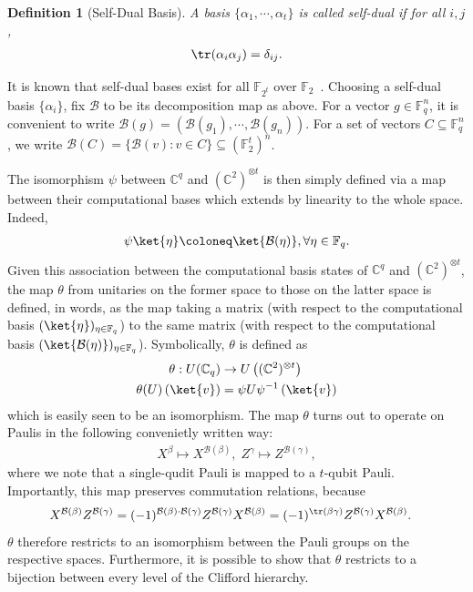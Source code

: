 \documentclass[11pt]{article}
\newtheorem{definition}[theorem]{Definition}
\theoremstyle{definition}
\newcommand{\al}{\alpha}
\newcommand{\CC}{\mathbb{C}}
\newcommand{\FF}{\mathbb{F}}
\newcommand{\B}{\mathcal{B}}
\begin{document}
\begin{definition}[Self-Dual Basis]
    A basis $\{\al_1, \cdots, \al_t\}$ is called self-dual if for all $i,j$,
    \begin{align}
        \tr(\al_i\al_j) = \delta_{ij}.
    \end{align}
\end{definition}
It is known that self-dual bases exist for all $\FF_{2^t}$ over $\mathbb{F}_2$~\cite{seroussi1980factorization}. Choosing a self-dual basis $\{\al_i\}$, fix $\B$ to be its decomposition map as above. 
For a vector $g\in \FF_q^n$, it is convenient to write $\B(g) = (\B(g_1), \cdots, \B(g_n))$. 
For a set of vectors $C\subseteq \FF_q^n$, we write $\B(C) = \{\B(v):v\in C\}\subseteq (\FF_2^t)^n$.

The isomorphism $\psi$ between $\mathbb{C}^q$ and $(\mathbb{C}^2)^{\otimes t}$ is then simply defined via a map between their computational bases which extends by linearity to the whole space.
Indeed,
\begin{align}
     \psi\ket{\eta} \coloneq \ket{\B(\eta)}, \forall \eta\in \FF_q.
\end{align}
Given this association between the computational basis states of $\mathbb{C}^q$ and $(\mathbb{C}^2)^{\otimes t}$, the map $\theta$ from unitaries on the former space to those on the latter space is defined, in words, as the map taking a matrix (with respect to the computational basis $(\ket{\eta})_{\eta \in \mathbb{F}_q}$) to the same matrix (with respect to the computational basis $(\ket{\B(\eta)})_{\eta \in \FF_q}$). Symbolically, $\theta$ is defined as
\begin{align}
    \theta : U(\CC_q) &\to U\left((\CC^2)^{\otimes t}\right)\\
    \theta(U)\left(\ket{v}\right) &= \psi U \psi^{-1}\left(\ket{v}\right)
\end{align}
which is easily seen to be an isomorphism. The map $\theta$ turns out to operate on Paulis in the following convenietly written way:
\begin{align}
    X^\beta \mapsto X^{\B(\beta)}, \; Z^\gamma \mapsto Z^{\B(\gamma)},
\end{align}
where we note that a single-qudit Pauli is mapped to a $t$-qubit Pauli. 
Importantly, this map preserves commutation relations, because
\begin{align}
    X^{\B(\beta)}Z^{\B(\gamma)}
    &= (-1)^{\B(\beta)\cdot \B(\gamma)}Z^{\B(\gamma)}X^{\B(\beta)}
    = (-1)^{\tr(\beta\gamma)}Z^{\B(\gamma)}X^{\B(\beta)}.
\end{align}
$\theta$ therefore restricts to an isomorphism between the Pauli groups on the respective spaces. Furthermore, it is possible to show that $\theta$ restricts to a bijection between every level of the Clifford hierarchy.
\end{document}
